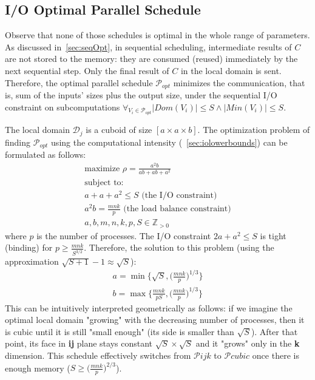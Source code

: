 \documentclass[sigplan,review,anonymous,10pt]{acmart}\settopmatter{printfolios=true,printccs=false,printacmref=false}
\begin{document}
\subsection{I/O Optimal Parallel Schedule}
\label{sec:parScheduling}

Observe that none of those schedules is optimal in the whole range of
parameters. As discussed in~\cref{sec:seqOpt}, in sequential scheduling, 
intermediate results of $C$ are not stored
to the memory: they are consumed (reused) immediately by the next
sequential step. Only the final result of $C$ in the local domain is sent.
Therefore, the optimal parallel schedule $\mathcal{P}_{opt}$ minimizes the
communication, that is, sum of the inputs' sizes plus the output size, under
the sequential I/O constraint on subcomputations $\forall_{V_i \in
\mathcal{P}_{opt}} |Dom(V_i)| \le S \land |Min(V_i)| \le S$.

The local domain $\mathcal{D}_j$ is a cuboid of size $[a \times a \times b]$. 
The optimization problem of finding $\mathcal{P}_{opt}$
using the 
computational intensity (~\cref{sec:iolowerbounds}) can be 
formulated as 
follows:
\begin{gather}
\label{eq:tileEq}
\nonumber
\text{maximize } \rho = \frac{a^2b}{ab + ab + a^2}\\
\nonumber
\text{subject to: } \\
\nonumber
a + a + a^2 \le S \text{ (the I/O constraint)} \\
\nonumber
a^2b = \frac{mnk}{p} \text{ (the load balance constraint)} \\
a, b, m, n, k, p, S \in \mathbb{Z}_{> 0}
\end{gather}
where $p$ is the number of processes. The I/O constraint $2a + 
a^2 \le 
S$ is tight (binding) for $p \ge \frac{mnk}{S^{3/2}}$. Therefore, the solution 
to this problem (using the 
approximation $\sqrt{S+1} - 1 \approx \sqrt{S}$):
\begin{gather}
\nonumber
a = \min\Big\{\sqrt{S}, \Big(\frac{mnk}{p}\Big)^{1/3} \Big\}\\
b = \max\Big\{\frac{mnk}{pS}, \Big(\frac{mnk}{p}\Big)^{1/3} \Big\}
\label{eq:optTileShape}
\end{gather}
\noindent
This can be intuitively interpreted geometrically as follows: if we 
imagine the 
optimal local domain "growing" with the decreasing number of processes, 
then it is 
cubic until it is still "small enough" (its side is smaller than 
$\sqrt{S}$). 
After that point, its face in \textbf{ij} plane stays constant 
$\sqrt{S} \times 
\sqrt{S}$ and it "grows" 
only in the \textbf{k} dimension. This schedule effectively switches 
from $\mathcal{P}ijk$ to $\mathcal{P}cubic$ once there is enough 
memory ($S \ge \big(\frac{mnk}{p}\big)^{2/3}$).
\end{document}

